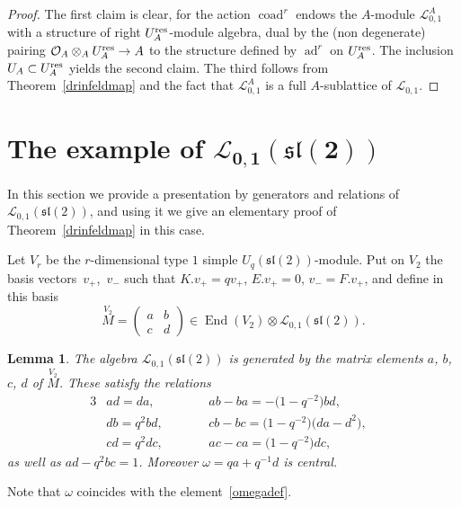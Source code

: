 \documentclass[pdftex]{sigma}%
\numberwithin{equation}{section}
\numberwithin{figure}{section}
\newtheorem{lem}[teo]{Lemma}
\newcommand{\Ll}{{\mathcal L}}
\newcommand{\Oo}{{\mathcal O}}
\newcommand{\ra}{\rightarrow}
\begin{document}
\begin{proof} The first claim is clear, for the action $\operatorname{coad}^r$ endows the $A$-module $\Ll_{0,1}^A$ with a structure of right $U_A^{\rm res}$-module algebra, dual by the (non degenerate) pairing $\Oo_A\otimes_A U_A^{\rm res}\ra A$ to the structure defined by $\operatorname{ad}^r$ on $U_A^{\rm res}$. The inclusion $U_A \subset U_A^{\rm res}$ yields the second claim. The third follows from Theorem~\ref{drinfeldmap} and the fact that $\Ll_{0,1}^A$ is a full $A$-sublattice of $\Ll_{0,1}$. \end{proof}

\section[The example of L\_\{0,1\}(sl(2))]{The example of $\boldsymbol{\Ll_{0,1}({\mathfrak{sl}}(2))}$}\label{sl2}

In this section we provide a presentation by generators and relations of $\Ll_{0,1}({\mathfrak{sl}}(2))$, and using it we give an elementary proof of Theorem~\ref{drinfeldmap} in this case.

Let $V_r$ be the $r$-dimensional type $1$ simple $U_q({\mathfrak{sl}}(2))$-module. Put on $V_2$ the basis vectors~$v_+$,~$v_-$ such that $K.v_+ = qv_+$, $E.v_+=0$, $v_- = F.v_+$, and define in this basis
\begin{equation}\label{notsl20}
\stackrel{V_2}{M}=\begin{pmatrix} a&b\\c&d\end{pmatrix} \in \operatorname{End}(V_2)\otimes \Ll_{0,1}({\mathfrak{sl}}(2)).
\end{equation}

\begin{lem}\label{genrel01} The algebra $\Ll_{0,1}({\mathfrak{sl}}(2))$ is generated by the matrix elements $a$, $b$, $c$, $d$ of $\stackrel{V_2}{M}$. These satisfy the relations
\begin{alignat}{3}
&ad=da,\qquad && ab-ba = -\big(1-q^{-2}\big)bd,&\nonumber \\
& db = q^2 bd ,\qquad && cb-bc = \big(1-q^{-2}\big)\big(da-d^2\big), & \label{rel01}\\
& cd = q^2dc ,\qquad && ac-ca=\big(1-q^{-2}\big)dc,&\nonumber
\end{alignat}
as well as $ad-q^2bc=1$. Moreover $\omega=qa+q^{-1}d$ is central.
\end{lem}

Note that $\omega$ coincides with the element~\eqref{omegadef}.
\end{document}
